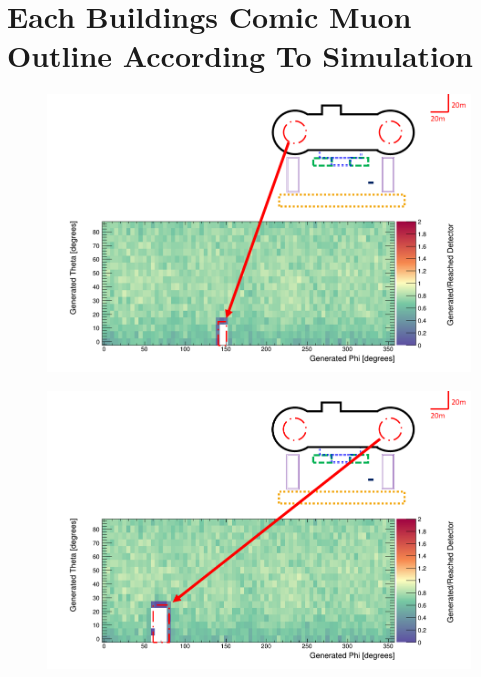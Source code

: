 
\chapter{Each Buildings Comic Muon Outline According To Simulation}

\begin{figure}
 \centering
 \includegraphics[width=\linewidth]{Chapter5/Figs/wylfaRasterNew/reactorCoreFarGen_Reached.png}
 \label{fig:reactorCoreFarGen_Reached}
\end{figure}

\begin{figure}
 \centering
 \includegraphics[width=\linewidth]{Chapter5/Figs/wylfaRasterNew/reactorCoreNearGen_Reached.png}
 \label{fig:reactorCoreNearGen_Reached}
\end{figure}

